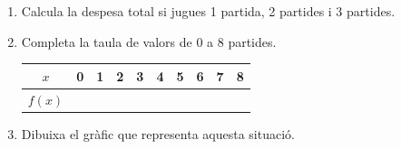 \documentclass[12pt,a4paper]{article}
\begin{document}
\begin{enumerate}[label=\alph*)]
    \item Calcula la despesa total si jugues 1 partida, 2 partides i 3 partides.
    \vspace{2.5cm}
    
    \item Completa la taula de valors de 0 a 8 partides.
    
    \vspace{0.3cm}
    \renewcommand{\arraystretch}{1.8}
    \begin{tabular}{|c|c|c|c|c|c|c|c|c|c|}
        \hline
        \textbf{$x$} & \hspace{0.4cm} 0 \hspace{0.4cm} & \hspace{0.4cm} 1 \hspace{0.4cm} & \hspace{0.4cm} 2 \hspace{0.4cm} & \hspace{0.4cm} 3 \hspace{0.4cm} & \hspace{0.4cm} 4 \hspace{0.4cm} & \hspace{0.4cm} 5 \hspace{0.4cm} & \hspace{0.4cm} 6 \hspace{0.4cm} & \hspace{0.4cm} 7 \hspace{0.4cm} & \hspace{0.4cm} 8 \hspace{0.4cm} \\ \hline
        \textbf{$f(x)$} & & & & & & & & & \\ \hline
    \end{tabular}
    \vspace{0.5cm}
    
    \item Dibuixa el gràfic que representa aquesta situació.
    
    \vspace{0.3cm}
    \begin{center}
    \end{center}
    

\end{enumerate}
\end{document}
